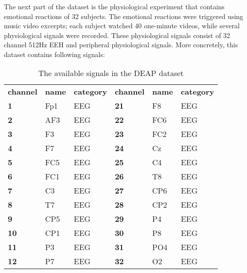 \npar

The next part of the dataset is the physiological experiment that contains emotional reactions of 32 subjects. The emotional reactions were triggered using music video excerpts; each subject watched 40 one-minute videos, while several physiological signals were recorded. These physiological signals consist of 32 channel 512Hz EEH and peripheral physiological signals. More concretely, this dataset contains following signals:
\begin{table}[]
\centering
\caption{The available signals in the DEAP dataset}
\label{DEAPSignals}
\begin{tabular}{lll|lll}
\textbf{channel} & \textbf{name} & \textbf{category} & \textbf{channel} & \textbf{name}    & \textbf{category} \\
\textbf{1}       & Fp1           & EEG               & \textbf{21}      & F8               & EEG               \\
\textbf{2}       & AF3           & EEG               & \textbf{22}      & FC6              & EEG               \\
\textbf{3}       & F3            & EEG               & \textbf{23}      & FC2              & EEG               \\
\textbf{4}       & F7            & EEG               & \textbf{24}      & Cz               & EEG               \\
\textbf{5}       & FC5           & EEG               & \textbf{25}      & C4               & EEG               \\
\textbf{6}       & FC1           & EEG               & \textbf{26}      & T8               & EEG               \\
\textbf{7}       & C3            & EEG               & \textbf{27}      & CP6              & EEG               \\
\textbf{8}       & T7            & EEG               & \textbf{28}      & CP2              & EEG               \\
\textbf{9}       & CP5           & EEG               & \textbf{29}      & P4               & EEG               \\
\textbf{10}      & CP1           & EEG               & \textbf{30}      & P8               & EEG               \\
\textbf{11}      & P3            & EEG               & \textbf{31}      & PO4              & EEG               \\
\textbf{12}      & P7            & EEG               & \textbf{32}      & O2               & EEG               \\

\end{tabular}
\end{table}
